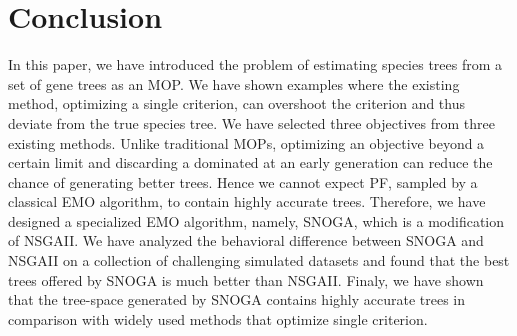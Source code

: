 \section{Conclusion} %
In this paper, we have introduced the problem of estimating species trees from a set of gene trees as an MOP. We have shown examples where the existing method, optimizing a single criterion, can overshoot the criterion and thus deviate from the true species tree. We have selected three objectives from three existing methods. Unlike traditional MOPs, optimizing an objective beyond a certain limit and discarding a dominated at an early generation can reduce the chance of generating better trees. Hence we cannot expect PF, sampled by a classical EMO algorithm, to contain highly accurate trees. Therefore, we have designed a specialized EMO algorithm, namely, SNOGA, which is a modification of NSGAII. %
We have analyzed the behavioral difference between SNOGA and NSGAII on a collection of challenging simulated datasets and found that the best trees offered by SNOGA is much better than NSGAII. Finaly, we have shown that the tree-space generated by SNOGA contains highly accurate trees in comparison with widely used methods that optimize single criterion.


